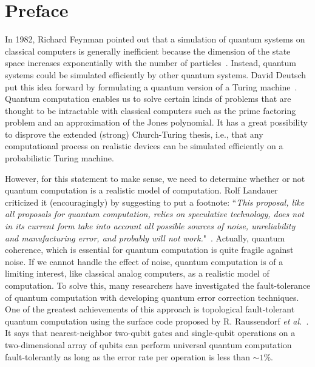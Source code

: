 %
%

\chapter*{Preface}
In 1982, Richard Feynman pointed out that
a simulation of quantum systems on classical computers
is generally inefficient because the dimension of the state space
increases exponentially with the number of particles~\cite{Feynman82}.
Instead, quantum systems could be simulated efficiently by other quantum systems.
David Deutsch put this idea forward
by formulating a quantum version of 
a Turing machine~\cite{Deutsch85}.
Quantum computation enables us 
to solve certain kinds of problems that 
are thought to be intractable with classical computers
such as the prime factoring problem
and an approximation of the Jones polynomial.
It has a great possibility to disprove the extended (strong) Church-Turing thesis,
i.e., that any computational process on realistic devices can be simulated 
efficiently on a probabilistic Turing machine.

However, for this statement to make sense,
we need to determine whether or not quantum computation
is a realistic model of computation.
Rolf Landauer criticized it (encouragingly)
by suggesting to put a footnote:
``{\it This proposal, like all proposals for quantum computation, 
relies on speculative technology, 
does not in its current form take into account 
all possible sources of noise, unreliability 
and manufacturing error, and
probably will not work.}"~\cite{LandauerLloyd}.
Actually, quantum coherence,
which is essential for quantum computation
is quite fragile against noise.
If we cannot handle the effect of noise,
quantum computation is of a limiting interest,
like classical analog computers,
as a realistic model of computation. 
To solve this, many researchers have investigated 
the fault-tolerance of quantum computation
with developing quantum error correction techniques.
One of the greatest achievements of this approach 
is topological fault-tolerant quantum computation
using the surface code
proposed by R. Raussendorf {\it et al.}~\cite{RaussendorfAnn,RaussendorfNJP,RaussendorfPRL}.
It says that 
nearest-neighbor two-qubit gates and single-qubit operations
on a two-dimensional array of qubits can perform 
universal quantum computation fault-tolerantly
as long as the error rate per operation is less than $\sim 1\%$.

